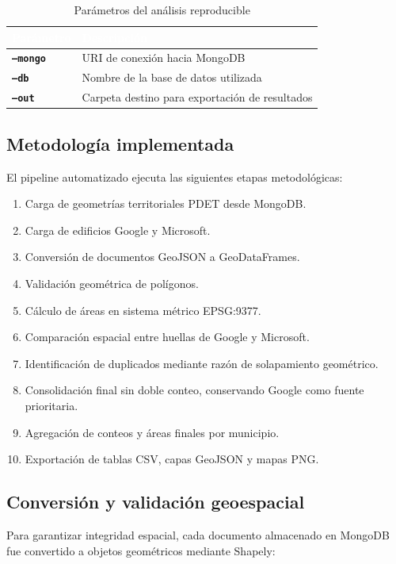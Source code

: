 \documentclass{article}
\newcommand{\tblhdr}[1]{%
  \cellcolor{azulclaro}\textbf{\textcolor{white}{#1}}%
}
\begin{document}
\begin{table}[H]
\centering
\caption{Parámetros del análisis reproducible}
\begin{tabular}{>{\bfseries}p{4cm} p{9cm}}
\toprule
\tblhdr{Parámetro} & \tblhdr{Descripción} \\
\midrule
\texttt{--mongo} & URI de conexión hacia MongoDB \\
\rowcolor{grisfilas}
\texttt{--db} & Nombre de la base de datos utilizada \\
\texttt{--out} & Carpeta destino para exportación de resultados \\
\bottomrule
\end{tabular}
\end{table}

\subsection{Metodología implementada}

El pipeline automatizado ejecuta las siguientes etapas metodológicas:

\begin{enumerate}
    \item Carga de geometrías territoriales PDET desde MongoDB.
    \item Carga de edificios Google y Microsoft.
    \item Conversión de documentos GeoJSON a GeoDataFrames.
    \item Validación geométrica de polígonos.
    \item Cálculo de áreas en sistema métrico EPSG:9377.
    \item Comparación espacial entre huellas de Google y Microsoft.
    \item Identificación de duplicados mediante razón de solapamiento geométrico.
    \item Consolidación final sin doble conteo, conservando Google como fuente prioritaria.
    \item Agregación de conteos y áreas finales por municipio.
    \item Exportación de tablas CSV, capas GeoJSON y mapas PNG.
\end{enumerate}

\subsection{Conversión y validación geoespacial}

Para garantizar integridad espacial, cada documento almacenado en MongoDB fue convertido a objetos geométricos mediante Shapely:
\end{document}
